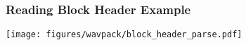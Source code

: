 \clearpage

\subsubsection{Reading Block Header Example}
\texttt{[image: figures/wavpack/block\_header\_parse.pdf]}


